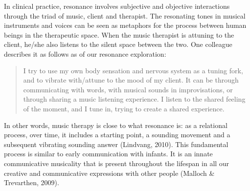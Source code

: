\begin{adjmulticols}{2}{0mm}{0mm}
In clinical practice, resonance involves subjective and objective interactions through the triad of music, client and therapist. The resonating tones in musical instruments and voices can be seen as metaphors for the process between human beings in the therapeutic space. When the music therapist is attuning to the client, he/she also listens to the silent space between the two. One colleague describes it as follows as of our resonance exploration: 
    \blockquote{I try to use my own body sensation and nervous system as a tuning fork, and to vibrate with/attune to the mood of my client. It can be through communicating with words, with musical sounds in improvisations, or through sharing a music listening experience. I listen to the shared feeling of the moment, and I tune in, trying to create a shared experience.}
In other words, music therapy is close to what resonance is: as a relational process, over time, it includes a starting point, a sounding movement and a subsequent vibrating sounding answer (Lindvang, 2010). This fundamental process is similar to early communication with infants. It is an innate communicative musicality that is present throughout the lifespan in all our creative and communicative expressions with other people (Malloch \& Trevarthen, 2009). 


\end{adjmulticols}
